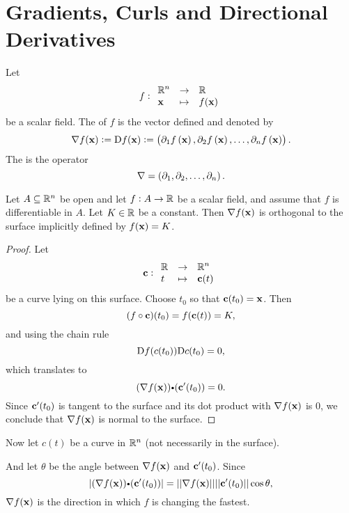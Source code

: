 \section{Gradients, Curls and Directional Derivatives}

\begin{df}
Let $$\fun{f}{\point{x}}{ f(\point{x})}{\reals^n}{\reals}$$be a
scalar field. The  of $ f$ is the vector  defined and
denoted by
$$\nabla f({\mathbf x}) := {\mathrm{D}} f ({\mathbf x}):= \left( \partial_{1} f \left({{\mathbf x}}\right) ,\partial_{2} f \left({{\mathbf x}}\right) ,\dots ,\partial_{n} f \left({{\mathbf x}}\right) \right).$$
The  is the operator
$$\nabla =  \left( \partial_1 ,\partial_2 ,\dots ,\partial_n \right).$$
\end{df}
\begin{thm}
Let $A \subseteq \mathbb{R}^n$ be open and  let $ f:A \rightarrow \mathbb{R}$
be a scalar field, and assume that $ f$ is differentiable in $A$. Let
$K\in\mathbb{R}$ be a constant. Then $\nabla f({\mathbf x})$ is orthogonal
to the surface implicitly defined by $ f({\mathbf x}) = K$.
\end{thm}
\begin{proof}
Let $$\fun{\point{c}}{t}{\point{c}(t)}{\reals}{\reals^n}$$be a curve
lying on this surface. Choose $t_0$ so that ${\mathbf c}(t_0) =
{\mathbf x}$. Then
$$ (f\circ {\mathbf c})(t_0) =  f({\mathbf c}(t)) = K,$$ and using the chain rule
$$ {\mathrm{D}} f(c(t_0)) {\mathrm{D}} c (t_0)=
0,$$which translates to
$$(\nabla f(\point{x}))\bp (\point{c}'(t_0))  = 0.$$
Since ${\mathbf c}'(t_0)$ is tangent to the surface and its dot
product with $\nabla f({\mathbf x})$ is $0$, we conclude that $\nabla
 f({\mathbf x})$ is normal to the surface.
\end{proof}


\begin{remark}
Now let $c(t)$ be a curve in $\mathbb{R}^n$ (not necessarily in the surface).

And let $\theta$ be the angle between $\nabla f({\mathbf x})$ and
${\mathbf c}'(t_0)$. Since
$$|(\nabla f(\point{x}))\bp (\point{c}'(t_0))| = ||\nabla f(\point{x})||||\point{c}'(t_0)||\cos\theta,$$
$\nabla f({\mathbf x})$ is the direction in which $ f$ is changing the
fastest.
\end{remark}

